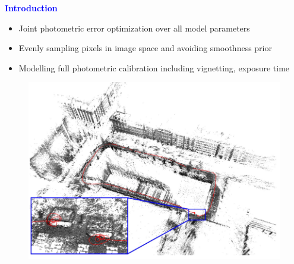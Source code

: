 \documentclass[aspectratio=169]{beamer}
\begin{document}
\begin{frame}{\textcolor{blue}{\textbf{Introduction}}}
	\vspace{-0.5cm}
	\begin{block}{\textbf{\textcolor{teal}{}}}
	\begin{itemize}
			\item Joint photometric error optimization over all model parameters
			\item Evenly sampling pixels in image space and avoiding smoothness prior
			\item Modelling full photometric calibration including vignetting, exposure time 
		\end{itemize}
	\end{block}

	\vspace{-0.4cm}

	\begin{figure}
		\centering
		\includegraphics[height=0.5\textheight]{pics/dso_intro.png}
	\end{figure}

\end{frame}
\end{document}

